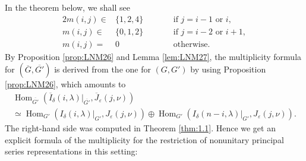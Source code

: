 In the theorem below, we shall see
\begin{alignat*}{2}
m(i,j) \in &\{ 1,2,4 \} \qquad
&&\text{if $j=i-1$ or $i$}, 
\\
m(i,j) \in &\{ 0,1,2 \} \qquad
&&\text{if $j=i-2$ or $i+1$}, 
\\
m(i,j) =& 0 \qquad
&&\text{otherwise}.  
\end{alignat*}
By Proposition \ref{prop:LNM26} and Lemma \ref{lem:LNM27}, 
 the multiplicity formula
 for $(\overline G, \overline {G'})$ is derived from 
 the one for $(G,G')$ 
 by using Proposition \ref{prop:LNM26}, 
 which amounts to  
\begin{multline*}
\operatorname{Hom}_{\overline{G'}}(\overline{I}_{\delta}(i,\lambda)|_{\overline{G'}}, \overline{J}_{\varepsilon}(j,\nu))
\\
\simeq
 \operatorname{Hom}_{G'}({I}_{\delta}(i,\lambda)|_{G'}, {J}_{\varepsilon}(j,\nu))
  \oplus
  \operatorname{Hom}_{G'}({I}_{\delta}(n-i,\lambda)|_{G'}, {J}_{\varepsilon}(j,\nu)).  
\end{multline*}
The right-hand side was computed 
 in Theorem \ref{thm:1.1}.  
Hence we get an explicit formula of the multiplicity
 for the restriction of nonunitary principal series representations
in this setting:

